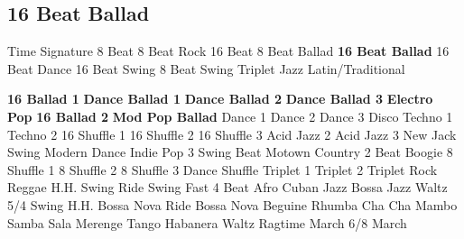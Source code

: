 \subsection{16 Beat Ballad}
Time Signature
8 Beat
8 Beat Rock
16 Beat
8 Beat Ballad
\textbf{16 Beat Ballad}
16 Beat Dance
16 Beat Swing
8 Beat Swing
Triplet
Jazz
Latin/Traditional





























\textbf{16 Ballad 1}
\textbf{Dance Ballad 1}
\textbf{Dance Ballad 2}
\textbf{Dance Ballad 3}
\textbf{Electro Pop}
\textbf{16 Ballad 2}
\textbf{Mod Pop Ballad}
Dance 1
Dance 2
Dance 3
Disco
Techno 1
Techno 2
16 Shuffle 1
16 Shuffle 2
16 Shuffle 3
Acid Jazz 2
Acid Jazz 3
New Jack Swing
Modern Dance
Indie Pop 3
Swing Beat
Motown
Country 2 Beat
Boogie
8 Shuffle 1
8 Shuffle 2
8 Shuffle 3
Dance Shuffle
Triplet 1
Triplet 2
Triplet Rock
Reggae
H.H. Swing
Ride Swing
Fast 4 Beat
Afro Cuban
Jazz Bossa
Jazz Waltz
5/4 Swing
H.H. Bossa Nova
Ride Bossa Nova
Beguine
Rhumba
Cha Cha
Mambo
Samba
Sala
Merenge
Tango
Habanera
Waltz
Ragtime
March
6/8 March
